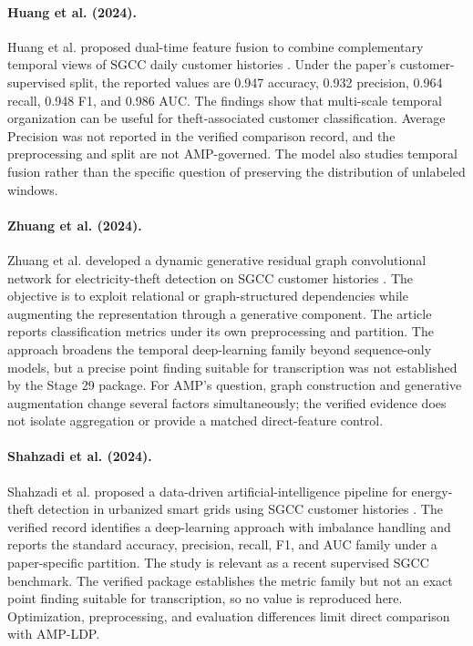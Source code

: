 \paragraph{Huang et al. (2024).}
Huang et al. proposed dual-time feature fusion to combine complementary temporal views of SGCC daily customer histories \cite{Huang2024DualTime}. Under the paper's customer-supervised split, the reported values are 0.947 accuracy, 0.932 precision, 0.964 recall, 0.948 F1, and 0.986 AUC. The findings show that multi-scale temporal organization can be useful for theft-associated customer classification. Average Precision was not reported in the verified comparison record, and the preprocessing and split are not AMP-governed. The model also studies temporal fusion rather than the specific question of preserving the distribution of unlabeled windows.

\paragraph{Zhuang et al. (2024).}
Zhuang et al. developed a dynamic generative residual graph convolutional network for electricity-theft detection on SGCC customer histories \cite{Zhuang2024GraphETD}. The objective is to exploit relational or graph-structured dependencies while augmenting the representation through a generative component. The article reports classification metrics under its own preprocessing and partition. The approach broadens the temporal deep-learning family beyond sequence-only models, but a precise point finding suitable for transcription was not established by the Stage 29 package. For AMP's question, graph construction and generative augmentation change several factors simultaneously; the verified evidence does not isolate aggregation or provide a matched direct-feature control.

\paragraph{Shahzadi et al. (2024).}
Shahzadi et al. proposed a data-driven artificial-intelligence pipeline for energy-theft detection in urbanized smart grids using SGCC customer histories \cite{Shahzadi2024Urbanized}. The verified record identifies a deep-learning approach with imbalance handling and reports the standard accuracy, precision, recall, F1, and AUC family under a paper-specific partition. The study is relevant as a recent supervised SGCC benchmark. The verified package establishes the metric family but not an exact point finding suitable for transcription, so no value is reproduced here. Optimization, preprocessing, and evaluation differences limit direct comparison with AMP-LDP.

